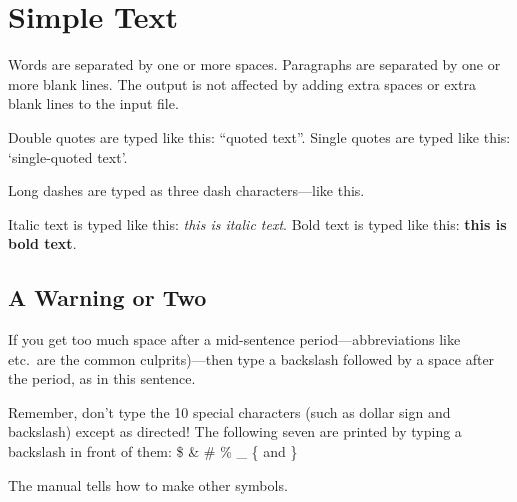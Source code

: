 \documentclass[11pt]{article}  %
\begin{document}

\section{Simple Text}          %

Words are separated by one or    more      spaces.  Paragraphs are
    separated by one or more blank lines.  The output is not affected
by adding extra spaces or extra blank lines to the input file.


Double quotes are typed like this: ``quoted text''.
Single quotes are typed like this: `single-quoted text'.

Long dashes are typed as three dash characters---like this.

Italic text is typed like this: {\em this is italic text}.
Bold   text is typed like this: {\bf this is  bold  text}.

\subsection{A Warning or Two}        %

If you get too much space after a mid-sentence period---abbreviations
like etc.\ are the common culprits)---then type a backslash followed by
a space after the period, as in this sentence.

Remember, don't type the 10 special characters (such as dollar sign and
backslash) except as directed!  The following seven are printed by
typing a backslash in front of them:  \$  \&  \#  \%  \_  \{  and  \}


The manual tells how to make other symbols.
\end{document}
